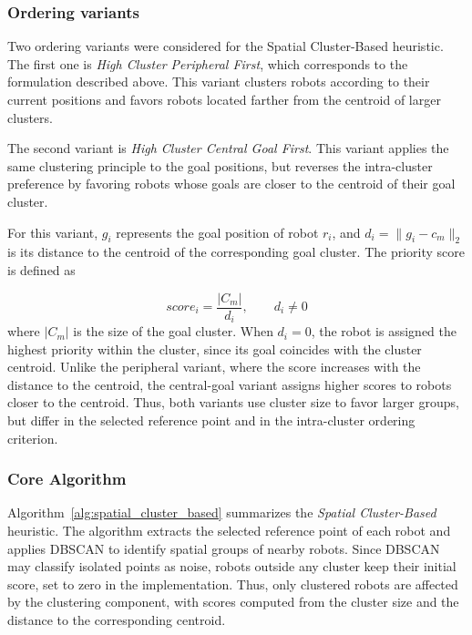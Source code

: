 \subsubsection{Ordering variants}
\label{subsubsec:spatial_cluster_based_ordering_variants}
\hspace{\parindent}
Two ordering variants were considered for the Spatial Cluster-Based heuristic. The first one is \textit{High Cluster Peripheral First}, which corresponds to the formulation described above. This variant clusters robots according to their current positions and favors robots located farther from the centroid of larger clusters.

The second variant is \textit{High Cluster Central Goal First}. This variant applies the same clustering principle to the goal positions, but reverses the intra-cluster preference by favoring robots whose goals are closer to the centroid of their goal cluster.

For this variant, \(g_i\) represents the goal position of robot \(r_i\), and \(d_i = \|g_i - c_m\|_2\) is its distance to the centroid of the corresponding goal cluster. The priority score is defined as

\begin{equation}
    score_i
    =
    \frac{|C_m|}{d_i},
    \qquad d_i \neq 0
    \label{eq:cluster_central_score}
\end{equation}
where \(|C_m|\) is the size of the goal cluster.
When \(d_i = 0\), the robot is assigned the highest priority within the cluster, since its goal
coincides with the cluster centroid.
Unlike the peripheral variant, where the score increases with the distance to the centroid, the central-goal variant assigns higher scores to robots closer to the centroid. Thus, both variants use cluster size to favor larger groups, but differ in the selected reference point and in the intra-cluster ordering criterion.

\subsubsection{Core Algorithm}
\label{subsubsec:spatial_cluster_based_pseudocode}
\hspace{\parindent}
Algorithm~\ref{alg:spatial_cluster_based} summarizes the \textit{Spatial Cluster-Based} heuristic. The algorithm extracts the selected reference point of each robot and applies DBSCAN to identify spatial groups of nearby robots. Since DBSCAN may classify isolated points as noise, robots outside any cluster keep their initial score, set to zero in the implementation. Thus, only clustered robots are affected by the clustering component, with scores computed from the cluster size and the distance to the corresponding centroid.

